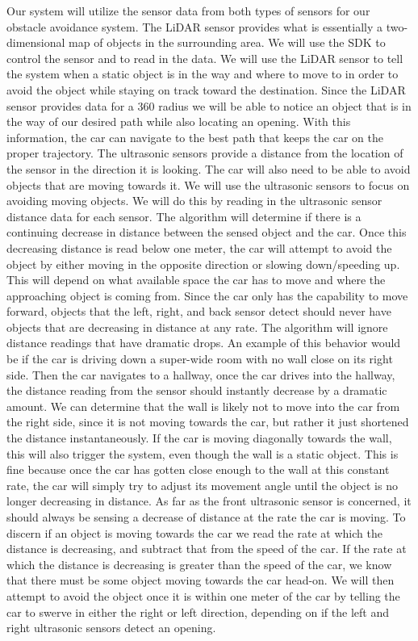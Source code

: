 \documentclass[onecolumn, draftclsnofoot, 10pt, compsoc]{IEEEtran}
\begin{document}
Our system will utilize the sensor data from both types of sensors for our obstacle avoidance system. The LiDAR sensor provides what is essentially a two-dimensional map of objects in the surrounding area. We will use the SDK to control the sensor and to read in the data. We will use the LiDAR sensor to tell the system when a static object is in the way and where to move to in order to avoid the object while staying on track toward the destination. Since the LiDAR sensor provides data for a 360 radius we will be able to notice an object that is in the way of our desired path while also locating an opening. With this information, the car can navigate to the best path that keeps the car on the proper trajectory. The ultrasonic sensors provide a distance from the location of the sensor in the direction it is looking. The car will also need to be able to avoid objects that are moving towards it. We will use the ultrasonic sensors to focus on avoiding moving objects. We will do this by reading in the ultrasonic sensor distance data for each sensor. The algorithm will determine if there is a continuing decrease in distance between the sensed object and the car. Once this decreasing distance is read below one meter, the car will attempt to avoid the object by either moving in the opposite direction or slowing down/speeding up. This will depend on what available space the car has to move and where the approaching object is coming from. Since the car only has the capability to move forward, objects that the left, right, and back sensor detect should never have objects that are decreasing in distance at any rate. The algorithm will ignore distance readings that have dramatic drops. An example of this behavior would be if the car is driving down a super-wide room with no wall close on its right side. Then the car navigates to a hallway, once the car drives into the hallway, the distance reading from the sensor should instantly decrease by a dramatic amount. We can determine that the wall is likely not to move into the car from the right side, since it is not moving towards the car, but rather it just shortened the distance instantaneously. If the car is moving diagonally towards the wall, this will also trigger the system, even though the wall is a static object. This is fine because once the car has gotten close enough to the wall at this constant rate, the car will simply try to adjust its movement angle until the object is no longer decreasing in distance. As far as the front ultrasonic sensor is concerned, it should always be sensing a decrease of distance at the rate the car is moving. To discern if an object is moving towards the car we read the rate at which the distance is decreasing, and subtract that from the speed of the car. If the rate at which the distance is decreasing is greater than the speed of the car, we know that there must be some object moving towards the car head-on. We will then attempt to avoid the object once it is within one meter of the car by telling the car to swerve in either the right or left direction, depending on if the left and right ultrasonic sensors detect an opening.
\end{document}
